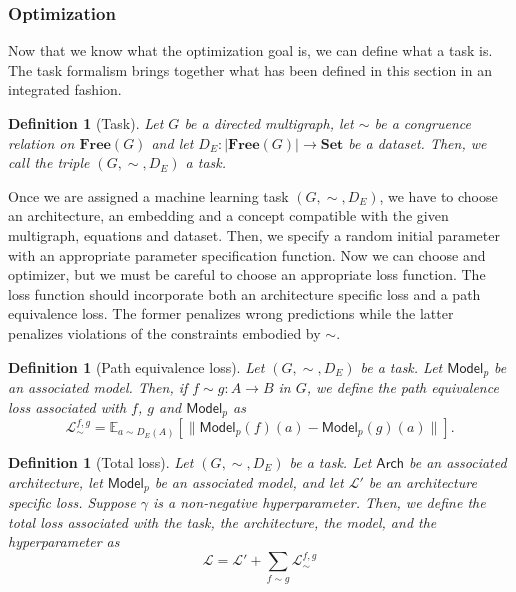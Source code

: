 \documentclass[11pt,a4paper,openright,twoside]{report}
\theoremstyle{plain}
\newtheorem{definition}[proposition]{Definition}
\theoremstyle{definition}
\begin{document}
\subsubsection{Optimization}

Now that we know what the optimization goal is, we can define what a task is. The task formalism brings together what has been defined in this section in an integrated fashion.

\begin{definition}[Task]
  Let $G$ be a directed multigraph, let ${\sim}$ be a congruence relation on $\mathbf{Free}(G)$ and let $D_E: |\mathbf{Free}(G)| \to \mathbf{Set}$ be a dataset. Then, we call the triple $(G,{\sim},D_E)$ a task.
\end{definition}

Once we are assigned a machine learning task $(G,{\sim},D_E)$, we have to choose an architecture, an embedding and a concept compatible with the given multigraph, equations and dataset. Then, we specify a random initial parameter with an appropriate parameter specification function. Now we can choose and optimizer, but we must be careful to choose an appropriate loss function. The loss function should incorporate both an architecture specific loss and a path equivalence loss. The former penalizes wrong predictions while the latter penalizes violations of the constraints embodied by ${\sim}$.

\begin{definition}[Path equivalence loss]
  Let $(G,{\sim},D_E)$ be a task. Let $\mathsf{Model}_p$ be an associated model. Then, if $f \sim g: A \to B$ in $G$, we define the path equivalence loss associated with $f$, $g$ and $\mathsf{Model}_p$ as 
  \[\mathcal{L}_{\sim}^{f,g} = \mathbb{E}_{a \sim D_E(A)}[\|\mathsf{Model}_p(f)(a) - \mathsf{Model}_p(g)(a)\|].\]  
\end{definition}

\begin{definition}[Total loss]
  Let $(G,{\sim},D_E)$ be a task. Let $\mathsf{Arch}$ be an associated architecture, let $\mathsf{Model}_p$ be an associated model, and let $\mathcal{L}'$ be an architecture specific loss. Suppose $\gamma$ is a non-negative hyperparameter. Then, we define the total loss associated with the task, the architecture, the model, and the hyperparameter as
  \begin{equation}
    \label{eq: sumoflosses}
    \mathcal{L} = \mathcal{L}' + \sum_{f \sim g}\mathcal{L}_{\sim}^{f,g}
  \end{equation}
\end{definition}
\end{document}
